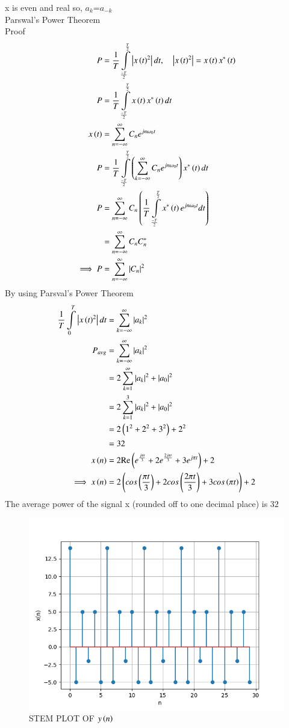 \documentclass[a4,12pt,onecolumn]{IEEEtran}
\begin{document}
x is even and real so, $a_k$=$a_{-k}$\\
Parswal's Power Theorem\\
Proof
\begin{align}
P&=\frac{1}{T}\int\limits_{\frac{-T}{2}}^{\frac{T}{2}}\left| x\left(t\right)^2 \right|dt ,\quad{\left| x\ensuremath{\left(t\right)}^2 \right|=x\ensuremath{\left(t\right)}x^*\ensuremath{\left(t\right)}}\\
P&=\frac{1}{T}\int\limits_{\frac{-T}{2}}^{\frac{T}{2}}x\left(t\right)x^*\left(t\right)dt \\
x\left(t\right)&=\sum\limits_{n=-\infty}^{\infty}C_ne^{jn\omega_0t}\\
P&=\frac{1}{T}\int\limits_{\frac{-T}{2}}^{\frac{T}{2}}\left(\sum\limits_{k=-\infty}^{\infty}C_ne^{jn\omega_0t}\right)x^*\left(t\right)dt\\
P&=\sum\limits_{n=-\infty}^{\infty}C_n\left(\frac{1}{T}\int\limits_{\frac{-T}{2}}^{\frac{T}{2}}x^*\left(t\right)e^{jn\omega_0t}dt\right)\\
&=\sum\limits_{n=-\infty}^{\infty}C_nC^*_n\\
\implies P&=\sum\limits_{n=-\infty}^{\infty}\left| C_n \right|^2
\end{align}
By using Parsval's Power Theorem
\begin{align}
\frac{1}{T}\int\limits_{0}^{T}\left| x\left(t\right)^2 \right|dt&=\sum\limits_{k=-\infty}^{\infty}\left| a_k \right|^2\\
P_{avg}&=\sum\limits_{k=-\infty}^{\infty}\left| a_k \right|^2\\
&=2\sum\limits_{k=1}^{\infty}\left| a_k \right|^2 +|a_0|^2\\
&=2\sum\limits_{k=1}^{3}\left| a_k \right|^2  +|a_0|^2 \\
&=2\left(1^2+2^2+3^2\right)+2^2\\
&=32\\
x\left(n\right)&=2\text{Re}\left(e^{\frac{j\pi t}{3}}+2e^{\frac{2j\pi t}{3}}+3e^{j\pi t}\right) + 2\\
\implies x\left(n\right)&=2\left(cos\left(\frac{\pi t}{3}\right)+2cos\left(\frac{2\pi t}{3}\right)+3cos\left(\pi t\right)\right) + 2
\end{align}
The average power of the signal x (rounded off to one decimal place) is $32$
\begin{figure}[ht!]
\includegraphics[width=\columnwidth]{figs/fig.png}
\caption{\large{STEM PLOT OF $y\left(n\right)$}}
\end{figure}
\end{document}
